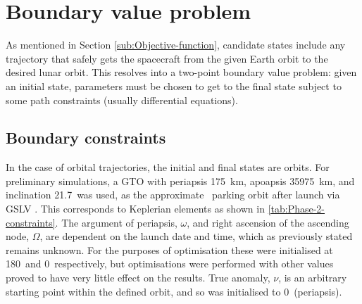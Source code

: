 
\section{Boundary value problem} \label{sec:Boundary-value-problem}

As mentioned in Section \ref{sub:Objective-function}, candidate states include any trajectory that safely gets the spacecraft from the given Earth orbit to the desired lunar orbit. This resolves into a two-point boundary value problem: given an initial state, parameters must be chosen to get to the final state subject to some path constraints (usually differential equations).


\subsection{Boundary constraints} \label{sub:Boundary-constraints}

In the case of orbital trajectories, the initial and final states are orbits. For preliminary simulations, a GTO with periapsis 175~km, apoapsis 35975~km, and inclination 21.7\degrees\ was used, as the approximate \BW\ parking orbit after launch via GSLV \parencite{GSLV}. This corresponds to Keplerian elements as shown in \autoref{tab:Phase-2-constraints}. The argument of periapsis, $\omega$, and right ascension of the ascending node, $\Omega$, are dependent on the launch date and time, which as previously stated remains unknown. For the purposes of optimisation these were initialised at 180\degrees\ and 0\degrees\ respectively, but optimisations were performed with other values proved to have very little effect on the results. True anomaly, $\nu$, is an arbitrary starting point within the defined orbit, and so was initialised to 0\degrees\ (periapsis).

